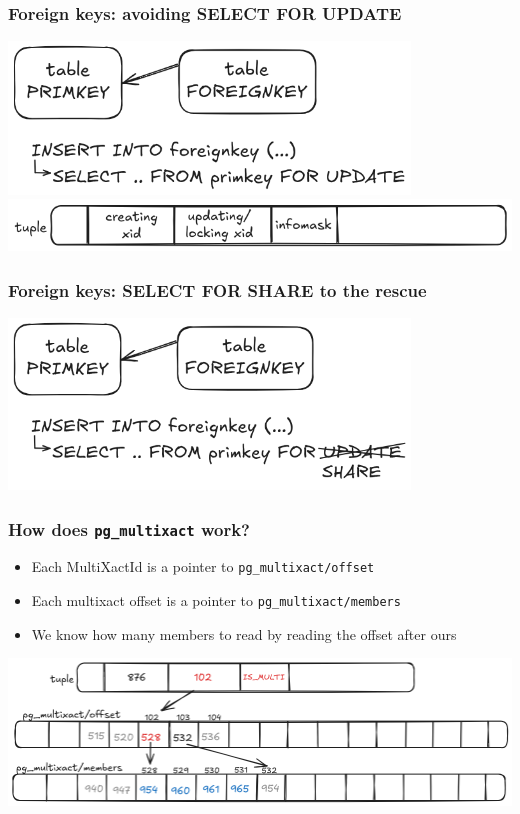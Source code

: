 \begin{frame}
  \frametitle{Foreign keys: avoiding SELECT FOR UPDATE}
  \includegraphics[width=0.8\textwidth]{select-for-update.png}
  \vspace{0.7cm}
  \includegraphics[width=\textwidth]{tuple.png}
\end{frame}

\begin{frame}
  \frametitle{Foreign keys: SELECT FOR SHARE to the rescue}
  \includegraphics[width=0.8\textwidth]{select-for-share.png}
\end{frame}

\begin{frame}
  \frametitle{How does \texttt{pg\_multixact} work?}
  \begin{itemize}
    \item Each MultiXactId is a pointer to \texttt{pg\_multixact/offset}
    \item Each multixact offset is a pointer to \texttt{pg\_multixact/members}
    \item We know how many members to read by reading the offset after ours
  \end{itemize}

  \includegraphics[width=\textwidth]{multixact.png}
\end{frame}

